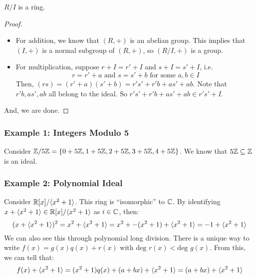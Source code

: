 \documentclass[letterpaper]{article}
\begin{document}
\begin{proposition}
    $R / I$ is a ring. 
\end{proposition}

\begin{mdframed}[]
    \begin{proof}
        \begin{itemize}
            \item For addition, we know that $(R, +)$ is an abelian group. This implies that $(I, +)$ is a normal subgroup of $(R, +)$, so $(R / I, +)$ is a group.
            \item For multiplication, suppose $r + I = r' + I$ and $s + I = s' + I$, i.e.
            \[r = r' + a \text{ and } s = s' + b \text{ for some } a, b \in I\]
            Then, $(rs) = (r' + a)(s' + b) = r's' + r'b + as' + ab$. Note that $r'b, as', ab$ all belong to the ideal. So $r's' + r'b + as' + ab \in r's' + I$.
        \end{itemize}
        And, we are done. 
    \end{proof}
\end{mdframed}


\subsubsection{Example 1: Integers Modulo 5}
Consider $\mathbb{Z} / 5\mathbb{Z} = \{0 + 5\mathbb{Z}, 1 + 5\mathbb{Z}, 2 + 5\mathbb{Z}, 3 + 5\mathbb{Z}, 4 + 5\mathbb{Z}\}$. We know that $5\mathbb{Z} \subseteq \mathbb{Z}$ is an ideal. 

\subsubsection{Example 2: Polynomial Ideal}
Consider $\mathbb{R}[x] / \langle x^2 + 1 \rangle$. This ring is ``isomorphic'' to $\mathbb{C}$. By identifying $x + \langle x^2 + 1 \rangle \in \mathbb{R}[x] / \langle x^2 + 1 \rangle$ as $i \in \mathbb{C}$, then:
\[(x + \langle x^2 + 1 \rangle)^2 = x^2 + \langle x^2 + 1 \rangle = x^2 + -(x^2 + 1) + \langle x^2 + 1 \rangle = -1 + \langle x^2 + 1 \rangle\]
We can also see this through polynomial long division. There is a unique way to write $f(x) = g(x)q(x) + r(x)$ with $\text{deg } r(x) < \text{deg } g(x)$. From this, we can tell that: 
\[f(x) + \langle x^2 + 1 \rangle = (x^2 + 1)q(x) + (a + bx) + \langle x^2 + 1 \rangle = (a + bx) + \langle x^2 + 1 \rangle\]
\end{document}
